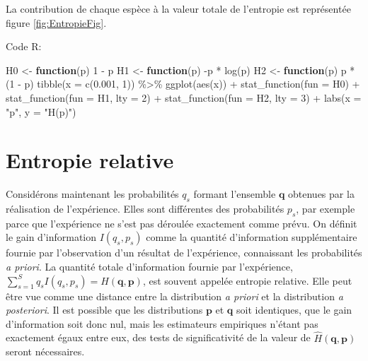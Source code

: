 \documentclass[
  11pt,
  american,
  a4paper,
  extrafontsizes,onecolumn,openright
  ]{memoir}
\newenvironment{Shaded}{\begin{snugshade}}{\end{snugshade}}
\newcommand{\AttributeTok}[1]{\textcolor[rgb]{0.77,0.63,0.00}{#1}}
\newcommand{\ControlFlowTok}[1]{\textcolor[rgb]{0.13,0.29,0.53}{\textbf{#1}}}
\newcommand{\DecValTok}[1]{\textcolor[rgb]{0.00,0.00,0.81}{#1}}
\newcommand{\FloatTok}[1]{\textcolor[rgb]{0.00,0.00,0.81}{#1}}
\newcommand{\FunctionTok}[1]{\textcolor[rgb]{0.00,0.00,0.00}{#1}}
\newcommand{\NormalTok}[1]{#1}
\newcommand{\OtherTok}[1]{\textcolor[rgb]{0.56,0.35,0.01}{#1}}
\newcommand{\SpecialCharTok}[1]{\textcolor[rgb]{0.00,0.00,0.00}{#1}}
\newcommand{\StringTok}[1]{\textcolor[rgb]{0.31,0.60,0.02}{#1}}
\begin{document}
\normalsize

La contribution de chaque espèce à la valeur totale de l'entropie est représentée figure \ref{fig:EntropieFig}.

Code R:

\scriptsize

\begin{Shaded}
\begin{Highlighting}[]
\NormalTok{H0 }\OtherTok{\textless{}{-}} \ControlFlowTok{function}\NormalTok{(p) }\DecValTok{1} \SpecialCharTok{{-}}\NormalTok{ p}
\NormalTok{H1 }\OtherTok{\textless{}{-}} \ControlFlowTok{function}\NormalTok{(p) }\SpecialCharTok{{-}}\NormalTok{p }\SpecialCharTok{*} \FunctionTok{log}\NormalTok{(p)}
\NormalTok{H2 }\OtherTok{\textless{}{-}} \ControlFlowTok{function}\NormalTok{(p) p }\SpecialCharTok{*}\NormalTok{ (}\DecValTok{1} \SpecialCharTok{{-}}\NormalTok{ p)}
\FunctionTok{tibble}\NormalTok{(}\AttributeTok{x =} \FunctionTok{c}\NormalTok{(}\FloatTok{0.001}\NormalTok{, }\DecValTok{1}\NormalTok{)) }\SpecialCharTok{\%\textgreater{}\%} 
  \FunctionTok{ggplot}\NormalTok{(}\FunctionTok{aes}\NormalTok{(x)) }\SpecialCharTok{+} 
    \FunctionTok{stat\_function}\NormalTok{(}\AttributeTok{fun =}\NormalTok{ H0) }\SpecialCharTok{+}
    \FunctionTok{stat\_function}\NormalTok{(}\AttributeTok{fun =}\NormalTok{ H1, }\AttributeTok{lty =} \DecValTok{2}\NormalTok{) }\SpecialCharTok{+}
    \FunctionTok{stat\_function}\NormalTok{(}\AttributeTok{fun =}\NormalTok{ H2, }\AttributeTok{lty =} \DecValTok{3}\NormalTok{) }\SpecialCharTok{+}
    \FunctionTok{labs}\NormalTok{(}\AttributeTok{x =} \StringTok{"p"}\NormalTok{, }\AttributeTok{y =} \StringTok{"H(p)"}\NormalTok{)}
\end{Highlighting}
\end{Shaded}

\normalsize

\hypertarget{entropie-relative}{%
\section{Entropie relative}\label{entropie-relative}}

Considérons maintenant les probabilités \(q_s\) formant l'ensemble \(\mathbf{q}\) obtenues par la réalisation de l'expérience.
Elles sont différentes des probabilités \(p_s\), par exemple parce que l'expérience ne s'est pas déroulée exactement comme prévu.
On définit le gain d'information \(I(q_s, p_s)\) comme la quantité d'information supplémentaire fournie par l'observation d'un résultat de l'expérience, connaissant les probabilités \emph{a priori}.
La quantité totale d'information fournie par l'expérience, \(\sum^S_{s=1}{q_s I(q_s, p_s)} = H(\mathbf{q}, \mathbf{p})\), est souvent appelée entropie relative.
Elle peut être vue comme une distance entre la distribution \emph{a priori} et la distribution \emph{a posteriori}.
Il est possible que les distributions \(\mathbf{p}\) et \(\mathbf{q}\) soit identiques, que le gain d'information soit donc nul, mais les estimateurs empiriques n'étant pas exactement égaux entre eux, des tests de significativité de la valeur de \(\hat{H}(\mathbf{q},\mathbf{p})\) seront nécessaires.
\end{document}
